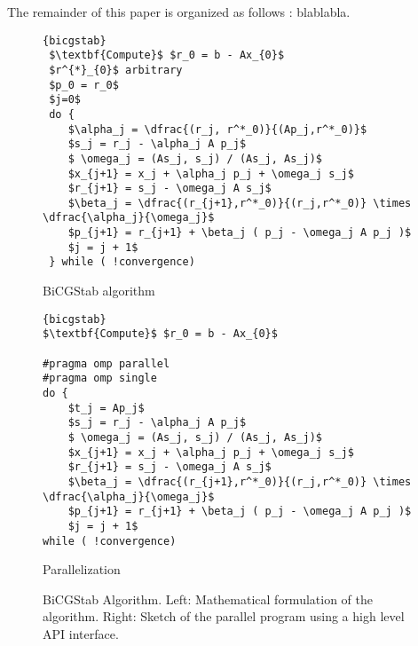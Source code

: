 \documentclass{Styles/llncs}
\begin{document}

The remainder of this paper is organized as follows : blablabla.

\begin{figure}[tc]
\begin{minipage}[c]{0.4\linewidth}
\begin{lstlisting}[frame=none,style=smaller,showlines=true,mathescape=true]{bicgstab}
 $\textbf{Compute}$ $r_0 = b - Ax_{0}$
 $r^{*}_{0}$ arbitrary
 $p_0 = r_0$
 $j=0$
 do {
	$\alpha_j = \dfrac{(r_j, r^*_0)}{(Ap_j,r^*_0)}$
	$s_j = r_j - \alpha_j A p_j$
	$ \omega_j = (As_j, s_j) / (As_j, As_j)$
	$x_{j+1} = x_j + \alpha_j p_j + \omega_j s_j$
	$r_{j+1} = s_j - \omega_j A s_j$
	$\beta_j = \dfrac{(r_{j+1},r^*_0)}{(r_j,r^*_0)} \times \dfrac{\alpha_j}{\omega_j}$
	$p_{j+1} = r_{j+1} + \beta_j ( p_j - \omega_j A p_j )$
	$j = j + 1$
 } while ( !convergence)
\end{lstlisting}
\centerline{BiCGStab algorithm}
\end{minipage}\hfill
\begin{minipage}[c]{0.5\linewidth}
\begin{lstlisting}[frame=none,style=smaller,showlines=true,mathescape=true,firstnumber=1]{bicgstab}
$\textbf{Compute}$ $r_0 = b - Ax_{0}$

#pragma omp parallel
#pragma omp single
do {
	$t_j = Ap_j$
	$s_j = r_j - \alpha_j A p_j$
	$ \omega_j = (As_j, s_j) / (As_j, As_j)$
	$x_{j+1} = x_j + \alpha_j p_j + \omega_j s_j$
	$r_{j+1} = s_j - \omega_j A s_j$
	$\beta_j = \dfrac{(r_{j+1},r^*_0)}{(r_j,r^*_0)} \times \dfrac{\alpha_j}{\omega_j}$
	$p_{j+1} = r_{j+1} + \beta_j ( p_j - \omega_j A p_j )$
	$j = j + 1$
while ( !convergence)
\end{lstlisting}
\centerline{Parallelization}
\end{minipage}
\caption{BiCGStab Algorithm. Left: Mathematical formulation of the algorithm. Right: Sketch of the parallel program using a high level API interface.} \label{lst:bicgstab}
\end{figure}
\end{document}
